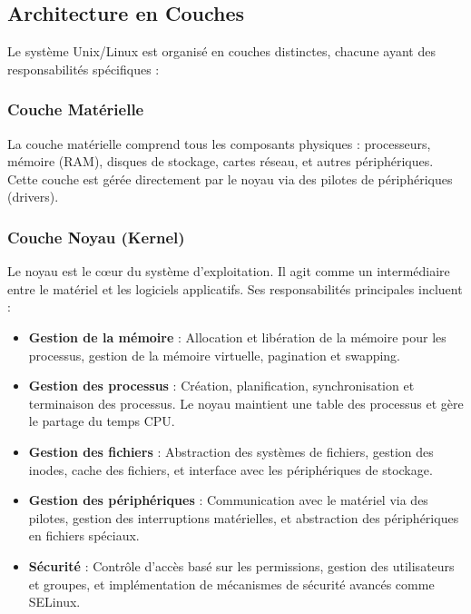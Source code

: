 \documentclass[12pt,a4paper]{article}
\begin{document}
\subsection{Architecture en Couches}

Le système Unix/Linux est organisé en couches distinctes, chacune ayant des responsabilités spécifiques :

\subsubsection{Couche Matérielle}
La couche matérielle comprend tous les composants physiques : processeurs, mémoire (RAM), disques de stockage, cartes réseau, et autres périphériques. Cette couche est gérée directement par le noyau via des pilotes de périphériques (drivers).

\subsubsection{Couche Noyau (Kernel)}
Le noyau est le cœur du système d'exploitation. Il agit comme un intermédiaire entre le matériel et les logiciels applicatifs. Ses responsabilités principales incluent :

\begin{itemize}
    \item \textbf{Gestion de la mémoire} : Allocation et libération de la mémoire pour les processus, gestion de la mémoire virtuelle, pagination et swapping.
    
    \item \textbf{Gestion des processus} : Création, planification, synchronisation et terminaison des processus. Le noyau maintient une table des processus et gère le partage du temps CPU.
    
    \item \textbf{Gestion des fichiers} : Abstraction des systèmes de fichiers, gestion des inodes, cache des fichiers, et interface avec les périphériques de stockage.
    
    \item \textbf{Gestion des périphériques} : Communication avec le matériel via des pilotes, gestion des interruptions matérielles, et abstraction des périphériques en fichiers spéciaux.
    
    \item \textbf{Sécurité} : Contrôle d'accès basé sur les permissions, gestion des utilisateurs et groupes, et implémentation de mécanismes de sécurité avancés comme SELinux.
\end{itemize}
\end{document}

